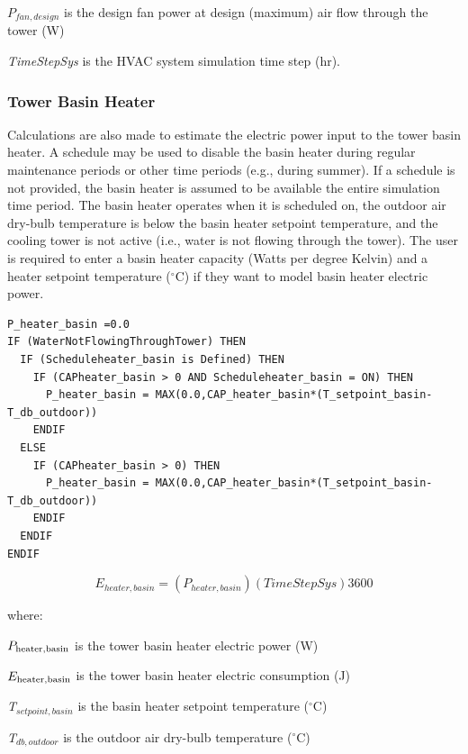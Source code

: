\({P_{fan,design}}\) is the design fan power at design (maximum) air flow through the tower (W)

\emph{TimeStepSys} is the HVAC system simulation time step (hr).

\subsubsection{Tower Basin Heater}\label{tower-basin-heater-1}

Calculations are also made to estimate the electric power input to the tower basin heater. A schedule may be used to disable the basin heater during regular maintenance periods or other time periods (e.g., during summer). If a schedule is not provided, the basin heater is assumed to be available the entire simulation time period. The basin heater operates when it is scheduled on, the outdoor air dry-bulb temperature is below the basin heater setpoint temperature, and the cooling tower is not active (i.e., water is not flowing through the tower). The user is required to enter a basin heater capacity (Watts per degree Kelvin) and a heater setpoint temperature (\(^{\circ}\)C) if they want to model basin heater electric power.

\begin{lstlisting}
P_heater_basin =0.0
IF (WaterNotFlowingThroughTower) THEN
  IF (Scheduleheater_basin is Defined) THEN
    IF (CAPheater_basin > 0 AND Scheduleheater_basin = ON) THEN
      P_heater_basin = MAX(0.0,CAP_heater_basin*(T_setpoint_basin-T_db_outdoor))
    ENDIF
  ELSE
    IF (CAPheater_basin > 0) THEN
      P_heater_basin = MAX(0.0,CAP_heater_basin*(T_setpoint_basin-T_db_outdoor))
    ENDIF
  ENDIF
ENDIF
\end{lstlisting}

\begin{equation}
{E_{heater,basin}} = \left( {P_{heater,basin}} \right)\left( {TimeStepSys} \right) {3600}
\end{equation}

where:

\({P_{{\rm{heater,basin}}}}\) is the tower basin heater electric power (W)

\({E_{{\rm{heater,basin}}}}\) is the tower basin heater electric consumption (J)

\emph{T\(_{setpoint,basin}\)} is the basin heater setpoint temperature (\(^{\circ}\)C)

\emph{T\(_{db,outdoor}\)} is the outdoor air dry-bulb temperature (\(^{\circ}\)C)

